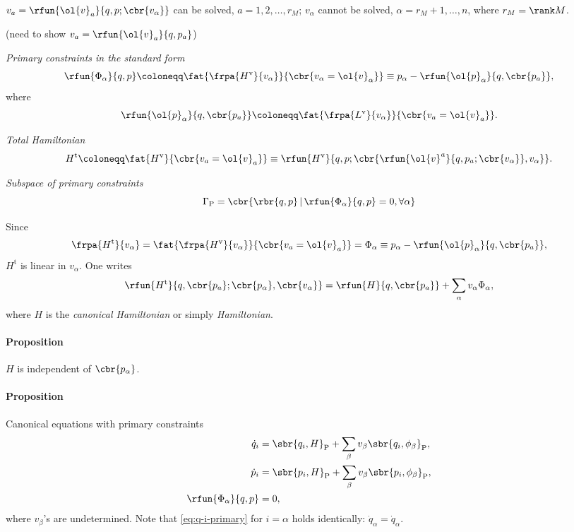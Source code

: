 \documentclass[a4paper,11pt]{article}
\begin{document}
$v_a = \rfun{\ol{v}_a}{q,p;\cbr{v_\alpha}}$ can be solved, $a = 1, 2, \ldots, 
r_M$; $v_\alpha$ 
cannot be solved, $\alpha = r_M + 1, \ldots, n$, where $r_M = \rank M$.

(need to show $v_a = \rfun{\ol{v}_a}{q,p_a}$)

\emph{Primary constraints in the standard form}
\begin{equation}
\rfun{\Phi_\alpha}{q, p} \coloneqq
\fat{\frpa{H^\text{v}}{v_\alpha}}{\cbr{v_\alpha = \ol{v}_\alpha}} \equiv
p_\alpha - \rfun{\ol{p}_\alpha}{q, \cbr{p_a}},
\end{equation}
where
\begin{equation}
\rfun{\ol{p}_\alpha}{q, \cbr{p_a}} 
\coloneqq \fat{\frpa{L^\text{v}}{v_\alpha}}{\cbr{v_a = \ol{v}_a}}.
\end{equation}


\emph{Total Hamiltonian}
\begin{equation}
H^\text{t} \coloneqq \fat{H^\text{v}}{\cbr{v_a = \ol{v}_a}} \equiv
\rfun{H^\text{v}}{q, p; \cbr{\rfun{\ol{v}^a}{q, p_a; \cbr{v_\alpha}}, 
v_\alpha}}.
\end{equation}

\emph{Subspace of primary constraints}
\begin{equation}
\Gamma_\text{P} = \cbr{ \rbr{q, p}\, |\, \rfun{\Phi_\alpha}{q, p} = 0, 
\forall \alpha}
\end{equation}

Since
\begin{equation}
\frpa{H^\text{t}}{v_\alpha} =
\fat{\frpa{H^\text{v}}{v_\alpha}}{\cbr{v_a = \ol{v}_a}} = \Phi_\alpha
\equiv p_\alpha - \rfun{\ol{p}_\alpha}{q, \cbr{p_a}},
\end{equation}
$H^\text{t}$ is linear in $v_\alpha$. One writes
\begin{equation}
\rfun{H^\text{t}}{q, \cbr{p_a}; \cbr{p_\alpha}, \cbr{v_\alpha}} = \rfun{H}{q, 
\cbr{p_a}} + \sum_\alpha v_\alpha \Phi_\alpha,
\end{equation}
where $H$ is the \emph{canonical Hamiltonian} or simply \emph{Hamiltonian}.

\paragraph{Proposition}
$H$ is independent of $\cbr{p_\alpha}$.

\paragraph{Proposition}
Canonical equations with primary constraints
\begin{align}
\dot{q}_i &= \sbr{q_i, H}_\text{P} + \sum_\beta v_\beta 
\sbr{q_i, \phi_\beta}_\text{P},
\label{eq:q-i-primary}\\
\dot{p}_i &= \sbr{p_i, H}_\text{P} + \sum_\beta v_\beta 
\sbr{p_i, \phi_\beta}_\text{P}, \\
\rfun{\Phi_\alpha}{q, p} &= 0,
\end{align}
where $v_\beta$'s are undetermined. Note that \cref{eq:q-i-primary} for $i = 
\alpha$ holds identically: $\dot{q}_\alpha = \dot{q}_\alpha$.
\end{document}
